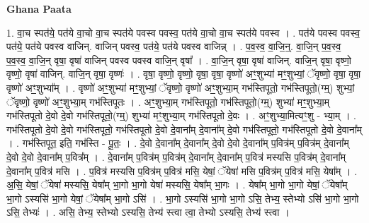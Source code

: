 \documentclass[17pt]{extarticle}
\begin{document}
\textbf{Ghana Paata } \newline

1. वा॒च स्पत॑ये॒ पत॑ये वा॒चो वा॒च स्पत॑ये पवस्व पवस्व॒ पत॑ये वा॒चो वा॒च स्पत॑ये पवस्व । . पत॑ये पवस्व पवस्व॒ पत॑ये॒ पत॑ये पवस्व वाजिन्. वाजिन् पवस्व॒ पत॑ये॒ पत॑ये पवस्व वाजिन्न् । . प॒व॒स्व॒ वा॒जि॒न्॒. वा॒जि॒न् प॒व॒स्व॒ प॒व॒स्व॒ वा॒जि॒न् वृषा॒ वृषा॑ वाजिन् पवस्व पवस्व वाजि॒न् वृषा᳚ । . वा॒जि॒न् वृषा॒ वृषा॑ वाजिन्. वाजि॒न् वृषा॒ वृष्णो॒ वृष्णो॒ वृषा॑ वाजिन्. वाजि॒न् वृषा॒ वृष्णः॑ । . वृषा॒ वृष्णो॒ वृष्णो॒ वृषा॒ वृषा॒ वृष्णो॑ अꣳ॒॒शुभ्या॑ मꣳ॒॒शुभ्यां॒ ॅवृष्णो॒ वृषा॒ वृषा॒ वृष्णो॑ अꣳ॒॒शुभ्या᳚म् । . वृष्णो॑ अꣳ॒॒शुभ्या॑ मꣳ॒॒शुभ्यां॒ ॅवृष्णो॒ वृष्णो॑ अꣳ॒॒शुभ्या॒म् गभ॑स्तिपूतो॒ गभ॑स्तिपूतो॒(ग्म्॒) शुभ्यां॒ ॅवृष्णो॒ वृष्णो॑ अꣳ॒॒शुभ्या॒म् गभ॑स्तिपूतः । . अꣳ॒॒शुभ्या॒म् गभ॑स्तिपूतो॒ गभ॑स्तिपूतो॒(ग्म्॒) शुभ्या॑ मꣳ॒॒शुभ्या॒म् गभ॑स्तिपूतो दे॒वो दे॒वो गभ॑स्तिपूतो॒(ग्म्॒) शुभ्या॑ मꣳ॒॒शुभ्या॒म् गभ॑स्तिपूतो दे॒वः । . अꣳ॒॒शुभ्या॒मित्यꣳ॒॒शु - भ्या॒म् । . गभ॑स्तिपूतो दे॒वो दे॒वो गभ॑स्तिपूतो॒ गभ॑स्तिपूतो दे॒वो दे॒वाना᳚म् दे॒वाना᳚म् दे॒वो गभ॑स्तिपूतो॒ गभ॑स्तिपूतो दे॒वो दे॒वाना᳚म् । . गभ॑स्तिपूत॒ इति॒ गभ॑स्ति - पू॒तः॒ । . दे॒वो दे॒वाना᳚म् दे॒वाना᳚म् दे॒वो दे॒वो दे॒वाना᳚म् प॒वित्र॑म् प॒वित्र॑म् दे॒वाना᳚म् दे॒वो दे॒वो दे॒वाना᳚म् प॒वित्र᳚म् । . दे॒वाना᳚म् प॒वित्र॑म् प॒वित्र॑म् दे॒वाना᳚म् दे॒वाना᳚म् प॒वित्र॑ मस्यसि प॒वित्र॑म् दे॒वाना᳚म् दे॒वाना᳚म् प॒वित्र॑ मसि । . प॒वित्र॑ मस्यसि प॒वित्र॑म् प॒वित्र॑ मसि॒ येषां॒ ॅयेषा॑ मसि प॒वित्र॑म् प॒वित्र॑ मसि॒ येषा᳚म् । . अ॒सि॒ येषां॒ ॅयेषा॑ मस्यसि॒ येषा᳚म् भा॒गो भा॒गो येषा॑ मस्यसि॒ येषा᳚म् भा॒गः । . येषा᳚म् भा॒गो भा॒गो येषां॒ ॅयेषा᳚म् भा॒गो ऽस्यसि॑ भा॒गो येषां॒ ॅयेषा᳚म् भा॒गो ऽसि॑ । . भा॒गो ऽस्यसि॑ भा॒गो भा॒गो ऽसि॒ तेभ्य॒ स्तेभ्यो ऽसि॑ भा॒गो भा॒गो ऽसि॒ तेभ्यः॑ । . असि॒ तेभ्य॒ स्तेभ्यो ऽस्यसि॒ तेभ्य॑ स्त्वा त्वा॒ तेभ्यो ऽस्यसि॒ तेभ्य॑ स्त्वा । \newline
\end{document}
